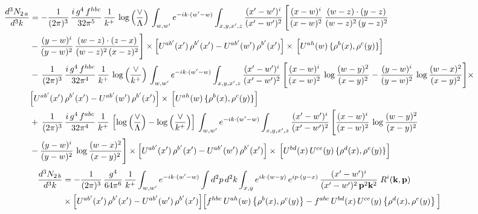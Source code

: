 \documentclass[9pt]{article}
\numberwithin{equation}{section}
\begin{document}
\begin{align}
    \frac{d^{3}N_{2\,a}}{d^{3}k} & = -\frac{1}{(2\pi)^{3}}\,\frac{i\,g^{4}\,f^{hbc}}{32\pi^{5}}\,\frac{1}{k^{+}}\,\log\left(\frac{\vee}{\Lambda}\right)\,
\int_{w,w'} e^{-ik\cdot(w'-w)}\int_{x,y,x',z}\frac{(x'-w')^{i}}{(x'-w')^{2}}\,\Bigg[\frac{(x-w)^{i}}{(x-w)^{2}}\, \frac{(w-z)\cdot (y-z)}{(w-z)^{2}\,(y-z)^{2}}\notag \\ & - \frac{(y-w)^{i}}{(y-w)^{2}}\, \frac{(w-z)\cdot (z-x)}{(w-z)^{2}\,(x-z)^{2}}\Bigg]\times\Big[U^{ab'}(x')\,\rho^{b'}(x')-U^{ab'}(w')\,\rho^{b'}(x')\Big]\times\, \Big[U^{ah}(w)\,\{\rho^{b}(x),\rho^{c}(y)\}\Big]\notag \\ & -\,\frac{1}{(2\pi)^{3}}\,\frac{i\,g^{4}\,f^{hbc}}{32\pi^{4}}\,\frac{1}{k^{+}}\,\log\left(\frac{\vee}{k^{+}}\right)\,
\int_{w,w'} e^{-ik\cdot(w'-w)}\int_{x,y,x',z}\frac{(x'-w')^{i}}{(x'-w')^{2}}\,\Bigg[\frac{(x-w)^{i}}{(x-w)^{2}}\,\log\frac{(w-y)^{2}}{(x-y)^{2}}-\frac{(y-w)^{i}}{(y-w)^{2}}\,\log\frac{(w-x)^{2}}{(x-y)^{2}}\Bigg]\times\notag \\ & \Big[U^{ab'}(x')\,\rho^{b'}(x')-U^{ab'}(w')\,\rho^{b'}(x')\Big]\times\, \Big[U^{ah}(w)\,\{\rho^{b}(x),\rho^{c}(y)\}\Big]\notag \\ & +\,\frac{1}{(2\pi)^{3}}\,\frac{i\,g^{4}\,f^{abc}}{32\pi^{4}}\,\frac{1}{k^{+}}\,\left[\log\left(\frac{\vee}{\Lambda}\right) - \log\left(\frac{\vee}{k^{+}}\right)\right]\,
\int_{w,w'} e^{-ik\cdot(w'-w)}\int_{x,y,x',z}\frac{(x'-w')^{i}}{(x'-w')^{2}}\,\Bigg[\frac{(x-w)^{i}}{(x-w)^{2}}\,\log\frac{(w-y)^{2}}{(x-y)^{2}}\notag \\ & -\frac{(y-w)^{i}}{(y-w)^{2}}\,\log\frac{(w-x)^{2}}{(x-y)^{2}}\Bigg]\times \Big[U^{ab'}(x')\,\rho^{b'}(x')-U^{ab'}(w')\,\rho^{b'}(x')\Big]\times\, \Big[U^{bd}(x)\,U^{ce}(y)\,\{\rho^{d}(x),\rho^{e}(y)\}\Big]
\end{align}
\begin{align}
\frac{d^{3}N_{2\,b}}{d^{3}k} & = -\frac{1}{(2\pi)^{3}}\,\frac{g^{4}}{64\pi^{6}}\,\frac{1}{k^{+}}\int_{w,w'} e^{-ik\cdot(w'-w)}
\int d^{2}p\,d^{2}k\int_{x,y} e^{ik\cdot(w-y)}\,e^{ip\cdot(y-x)}\,\frac{(x'-w')^{i}}{(x'-w')^{2}\,\mathbf{p}^{2}\mathbf{k}^{2}}\;R^{i}(\mathbf{k},\mathbf{p})\notag\\
&\times\Big[U^{ab'}(x')\,\rho^{b'}(x')-U^{ab'}(w')\,\rho^{b'}(x')\Big]
\Big[f^{hbc}\,U^{ah}(w)\left\{\rho^{b}(x),\rho^{c}(y)\right\}-f^{abc}\,U^{bd}(x)\,U^{ce}(y)\left\{\rho^{d}(x),\rho^{e}(y)\right\}\Big]
\end{align}
\end{document}
